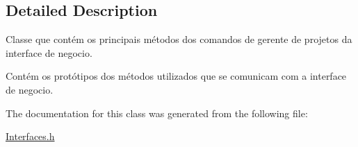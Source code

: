 \subsection{Detailed Description}
Classe que contém os principais métodos dos comandos de gerente de projetos da interface de negocio. 

Contém os protótipos dos métodos utilizados que se comunicam com a interface de negocio. 

The documentation for this class was generated from the following file\+:\begin{DoxyCompactItemize}
\item 
\hyperlink{_interfaces_8h}{Interfaces.\+h}\end{DoxyCompactItemize}
